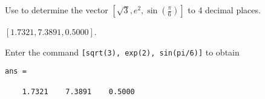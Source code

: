 \documentclass{ximera}
\begin{document}
\begin{computerExercise} \label{YZ_1.2_operation2}
Use \Matlab to determine the vector $[\sqrt{3}, e^2, \sin(\frac{\pi}{6})]$ to 4 decimal places.

\begin{solution}
\ans $[1.7321, 7.3891, 0.5000]$.

\soln
Enter the \Matlab command {\tt [sqrt(3), exp(2), sin(pi/6)]} to obtain
\begin{verbatim}
ans =

    1.7321    7.3891    0.5000
\end{verbatim}
\end{solution}
\end{computerExercise}
\end{document}
